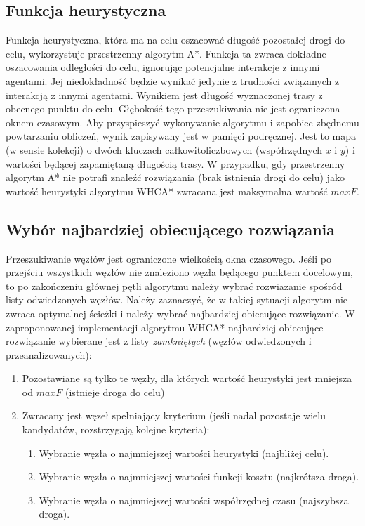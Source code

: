 \subsection{Funkcja heurystyczna}
Funkcja heurystyczna, która ma na celu oszacować długość pozostałej drogi do celu, wykorzystuje przestrzenny algorytm A*.
Funkcja ta zwraca dokładne oszacowania odległości do celu, ignorując potencjalne interakcje z innymi agentami. Jej niedokładność będzie wynikać jedynie z trudności związanych z interakcją z innymi agentami.
Wynikiem jest długość wyznaczonej trasy z obecnego punktu do celu.
Głębokość tego przeszukiwania nie jest ograniczona oknem czasowym.
Aby przyspieszyć wykonywanie algorytmu i zapobiec zbędnemu powtarzaniu obliczeń, wynik zapisywany jest w pamięci podręcznej.
Jest to mapa (w sensie kolekcji) o dwóch kluczach całkowitoliczbowych (współrzędnych $x$ i $y$) i wartości będącej zapamiętaną długością trasy.
W przypadku, gdy przestrzenny algorytm A* nie potrafi znaleźć rozwiązania (brak istnienia drogi do celu) jako wartość heurystyki algorytmu WHCA* zwracana jest maksymalna wartość $maxF$.

\subsection{Wybór najbardziej obiecującego rozwiązania}
Przeszukiwanie węzłów jest ograniczone wielkością okna czasowego. Jeśli po przejściu wszystkich węzłów nie znaleziono węzła będącego punktem docelowym, to po zakończeniu głównej pętli algorytmu należy wybrać rozwiazanie spośród listy odwiedzonych węzłów.
Należy zaznaczyć, że w takiej sytuacji algorytm nie zwraca optymalnej ścieżki i należy wybrać najbardziej obiecujące rozwiązanie.
W zaproponowanej implementacji algorytmu WHCA* najbardziej obiecujące rozwiązanie wybierane jest z listy {\it zamkniętych} (węzłów odwiedzonych i przeanalizowanych):
\begin{enumerate}
	\item Pozostawiane są tylko te węzły, dla których wartość heurystyki jest mniejsza od $maxF$ (istnieje droga do celu)
	\item Zwracany jest węzeł spełniający kryterium (jeśli nadal pozostaje wielu kandydatów, rozstrzygają kolejne kryteria):
	\begin{enumerate}
		\item Wybranie węzła o najmniejszej wartości heurystyki (najbliżej celu).
		\item Wybranie węzła o najmniejszej wartości funkcji kosztu (najkrótsza droga).
		\item Wybranie węzła o najmniejszej wartości współrzędnej czasu (najszybsza droga).
	\end{enumerate}
\end{enumerate}

